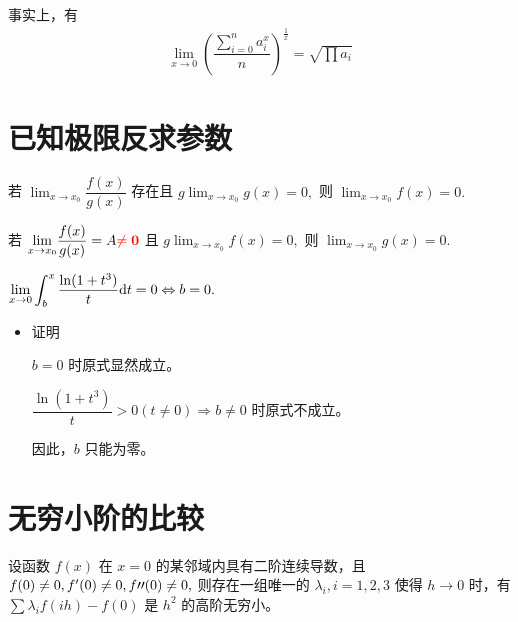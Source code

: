事实上，有
\begin{equation*}
    \begin{aligned}
        {\displaystyle\lim_{x\rightarrow 0}}
        \left(\dfrac{\sum_{i=0}^n a_i^x}{n}\right)^\frac{1}{x}
        = \sqrt{\prod a_i}
    \end{aligned}
\end{equation*}

\section{已知极限反求参数}

若 $ {\displaystyle\lim_{x\rightarrow x_0}}\dfrac{f(x)}{g(x)} $ 存在且
$ g{\displaystyle\lim_{x\rightarrow x_0}}g(x) = 0, $ 则 $ {\displaystyle\lim_{x\rightarrow x_0}}f(x) = 0. $ 

若 $ {\displaystyle\lim_{x\rightarrow x_0}}\dfrac{f(x)}{g(x)} = A \textcolor{red}{\bf{\neq 0}} $ 且
$ g{\displaystyle\lim_{x\rightarrow x_0}}f(x) = 0, $ 则 $ {\displaystyle\lim_{x\rightarrow x_0}}g(x) = 0. $ 


$ {\displaystyle\lim_{x\rightarrow 0}}
\displaystyle \int_b^x \dfrac{\ln(1+t^3)}{t}\mathrm{d}t = 0 \Leftrightarrow b = 0. $

\begin{itemize}
    \item 证明
    
    $ b = 0 $ 时原式显然成立。

    $ \dfrac{\ln(1+t^3)}{t} > 0 (t\neq 0)\Rightarrow b \neq 0 $ 时原式不成立。
    
    因此，$ b $ 只能为零。
\end{itemize}

\section{无穷小阶的比较}


设函数 $ f(x) $ 在 $ x = 0 $ 的某邻域内具有二阶连续导数，且 $ f(0)\neq 0,f'(0)\neq 0,f{\prime\prime}(0)
\neq 0, $ 则存在一组唯一的 $ \lambda_i,i=1,2,3 $ 使得 $ h\rightarrow 0 $ 时，有
$ \sum \lambda_if(ih) - f(0) $ 是 $ h^2 $ 的高阶无穷小。

